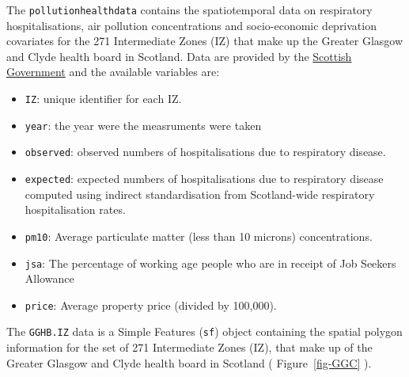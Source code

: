 \documentclass[
  letterpaper,
  DIV=11,
  numbers=noendperiod]{scrartcl}
\providecommand{\tightlist}{%
  \setlength{\itemsep}{0pt}\setlength{\parskip}{0pt}}\usepackage{longtable,booktabs,array}
\begin{document}
The \texttt{pollutionhealthdata} contains the spatiotemporal data on
respiratory hospitalisations, air pollution concentrations and
socio-economic deprivation covariates for the 271 Intermediate Zones
(IZ) that make up the Greater Glasgow and Clyde health board in
Scotland. Data are provided by the
\href{http://statistics.gov.scot.}{Scottish Government} and the
available variables are:

\begin{itemize}
\tightlist
\item
  \texttt{IZ}: unique identifier for each IZ.
\item
  \texttt{year}: the year were the measruments were taken
\item
  \texttt{observed}: observed numbers of hospitalisations due to
  respiratory disease.
\item
  \texttt{expected}: expected numbers of hospitalisations due to
  respiratory disease computed using indirect standardisation from
  Scotland-wide respiratory hospitalisation rates.
\item
  \texttt{pm10}: Average particulate matter (less than 10 microns)
  concentrations.
\item
  \texttt{jsa}: The percentage of working age people who are in receipt
  of Job Seekers Allowance
\item
  \texttt{price}: Average property price (divided by 100,000).
\end{itemize}

The \texttt{GGHB.IZ} data is a Simple Features (\texttt{sf}) object
containing the spatial polygon information for the set of 271
Intermediate Zones (IZ), that make up of the Greater Glasgow and Clyde
health board in Scotland ( Figure~\ref{fig-GGC} ).
\end{document}
